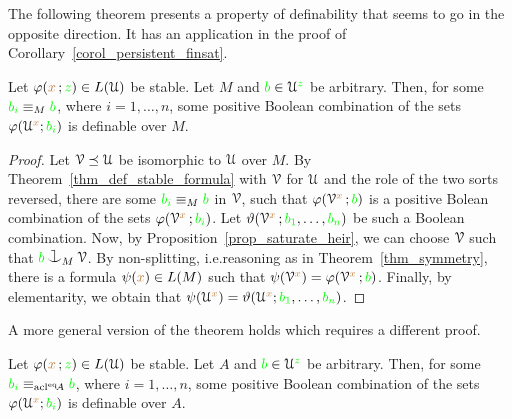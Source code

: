 
The following theorem presents a property of definability that seems to go in the opposite direction.
It has an application in the proof of Corollary~\ref{corol_persistent_finsat}.

\begin{theorem}\label{thm_stability_definable_rovescio1}
  Let $\varphi({\color{brown} x}\,;{\color{green} z})\in L(\EuScript U)$ be stable.
  Let $M$ and ${\color{green} b}\in\EuScript U^{\color{green} z}$ be arbitrary.
  Then, for some ${\color{green} b_i}\equiv_M{\color{green} b}$, where $i=1,\dots,n$, some positive Boolean combination of the sets $\varphi(\EuScript U^{\color{brown} x};{\color{green} b_i})$ is definable over $M$.
\end{theorem}

\begin{proof}
  Let $\EuScript V\preceq\EuScript U$ be isomorphic to $\EuScript U$ over $M$.
  By Theorem~\ref{thm_def_stable_formula} with $\EuScript V$ for $\EuScript U$ and the role of the two sorts reversed, there are  some  ${\color{green} b_i}\equiv_M{\color{green} b}$ in $\EuScript V$, such that $\varphi(\EuScript V^{\color{brown} x}\,;{\color{green} b})$ is a positive Bolean combination of the sets $\varphi(\EuScript V^{\color{brown} x}\,;{\color{green} b_i})$.
  Let $\vartheta(\EuScript V^{\color{brown} x}\,;{\color{green} b_1},\dots,{\color{green} b_n})$ be such a Boolean combination.
  Now, by Proposition~\ref{prop_saturate_heir}, we can choose $\EuScript V$ such that ${\gr b}\cnonfork_M\V$.
  By non-splitting, i.e.\@ reasoning as in Theorem~\ref{thm_symmetry}, there is a formula $\psi({\color{brown} x})\in L(M)$ such that $\psi(\EuScript V^{\color{brown} x})=\varphi(\EuScript V^{\color{brown} x}\,;{\color{green} b})$.
  Finally, by elementarity, we obtain that $\psi(\EuScript U^{\color{brown} x})=\vartheta(\EuScript U^{\color{brown} x};{\color{green} b_1},\dots,{\color{green} b_n})$.
\end{proof}

A more general version of the theorem holds which requires a different proof.

\begin{theorem}\label{thm_stability_definable_rovescio2}
  Let $\varphi({\color{brown} x}\,;{\color{green} z})\in L(\EuScript U)$ be stable.
  Let $A$ and ${\color{green} b}\in\EuScript U^{\color{green} z}$ be arbitrary.
  Then, for some ${\color{green} b_i}\equiv_{{\rm acl}^{{\rm eq}}\!A}{\color{green} b}$, where $i=1,\dots,n$, some positive Boolean combination of the sets $\varphi(\EuScript U^{\color{brown} x};{\color{green} b_i})$ is definable over $A$.
\end{theorem}

